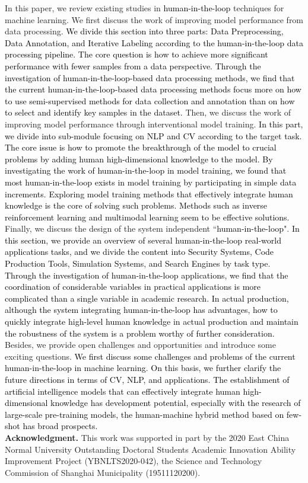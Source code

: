 \documentclass{article}
\newcommand{\REO}[1]{\textcolor{black}{#1}}
\newcommand{\ZJH}[1]{\textcolor{black}{#1}}
\begin{document}
In this paper, we review existing studies in \REO{human-in-the-loop} techniques for machine learning.
We first discuss the work of improving model performance from data processing.
\REO{\ZJH{We divide this section} into three parts: Data Preprocessing, Data Annotation, and Iterative Labeling according to the \REO{human-in-the-loop} data processing pipeline. The core question is how to achieve more significant performance with fewer samples from a data perspective. Through the investigation of \REO{human-in-the-loop}-based data processing methods, we \ZJH{find} that the current \REO{human-in-the-loop}-based data processing methods focus more on how to use semi-supervised methods for data collection and \ZJH{annotation} than on how to select and \ZJH{identify} key samples in the dataset.}
Then, we discuss the work of improving model performance through interventional model training.
\REO{
In this part, we divide into sub-module focusing on NLP and CV according to the target task. The core issue is how to promote the breakthrough of the model to crucial problems by adding human high-dimensional knowledge to the model. By investigating the work of \REO{human-in-the-loop} in model training, we found that most \REO{human-in-the-loop} exists in model training by participating in simple data increments. Exploring model training methods that effectively integrate human knowledge is the core of solving such problems. Methods such as inverse reinforcement learning and multimodal learning seem to be effective solutions.
}
Finally, we discuss the design of the system independent ``\REO{human-in-the-loop}".
\REO{
In this section, we provide an overview of several \REO{human-in-the-loop} real-world applications tasks, and we divide the content into Security Systems, Code Production Tools, Simulation Systems, and Search Engines by task type. Through the investigation of \REO{human-in-the-loop} applications, we \ZJH{find} that the coordination of considerable variables in practical applications is more complicated than a single variable in academic research. In actual production, although the system integrating \REO{human-in-the-loop} has advantages, how to quickly integrate high-level human knowledge in actual production and maintain the robustness of the system is a problem worthy of further consideration.
}
Besides, we provide open challenges and opportunities and introduce some exciting questions.
\REO{We first \ZJH{discuss} some challenges and problems of the current \REO{human-in-the-loop} in machine learning. On this basis, we further \ZJH{clarify} the future directions in terms of CV, NLP, and applications. The establishment of artificial intelligence models that can effectively integrate human high-dimensional knowledge has development potential, especially with the research of large-scale pre-training models, the human-machine hybrid method based on few-shot has broad prospects.}
\\


\noindent\textbf{Acknowledgment.}
This work was supported in part by the 2020 East China Normal University Outstanding Doctoral Students Academic Innovation Ability Improvement Project (YBNLTS2020-042), the Science and Technology Commission of Shanghai Municipality (19511120200).


\small{

}
\end{document}
